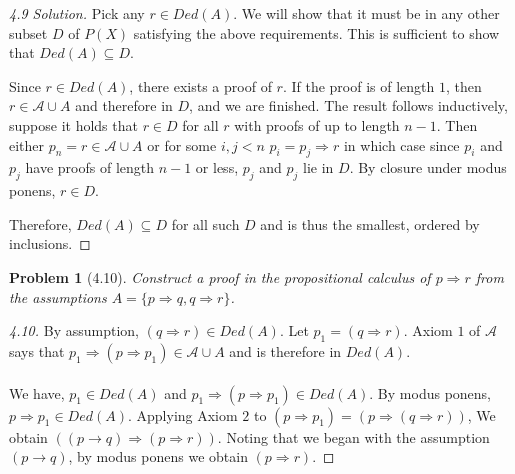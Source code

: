 \documentclass{article}
\theoremstyle{problemstyle}
\newtheorem{problem}{Problem}
\begin{document}
\begin{proof}[4.9 Solution]
Pick any $r \in Ded(A)$. We will show that it must be in any other subset $D$ of $P(X)$ satisfying the above requirements. This is sufficient to show that $Ded(A) \subseteq D$. 

Since $r \in Ded(A)$, there exists a proof of $r$. If the proof is of length $1$, then $r \in \mathscr{A} \cup A$ and therefore in $D$, and we are finished. The result follows inductively, suppose it holds that $r \in D$ for all $r$ with proofs of up to length $n-1$. Then either $p_n = r \in \mathscr{A} \cup A$ or for some $i,j<n$ $p_i = p_j \Rightarrow r$ in which case since $p_i$ and $p_j$ have proofs of length $n-1$ or less, $p_j$ and $p_j$ lie in $D$.  By closure under modus ponens, $r \in D$. 

Therefore, $Ded(A) \subseteq D$ for all such $D$ and is thus the smallest, ordered by inclusions. 
\end{proof}

\begin{problem}[4.10] 
Construct a proof in the propositional calculus of $p \Rightarrow r$ from the assumptions $A = \{p\Rightarrow q, q\Rightarrow r\}$. 
\end{problem}
\begin{proof}[4.10] 
By assumption, $(q \Rightarrow r) \in Ded(A)$. Let $p_1 = (q \Rightarrow r)$. Axiom $1$ of $\mathscr{A}$ says that $p_1 \Rightarrow (p \Rightarrow p_1) \in \mathscr{A} \cup A$ and is therefore in $Ded(A)$.\\\\We have, $p_1 \in Ded(A)$ and $p_1 \Rightarrow (p \Rightarrow p_1) \in Ded(A)$. By modus ponens, $p \Rightarrow p_1 \in Ded(A)$. Applying Axiom $2$ to $(p \Rightarrow p_1) = (p \Rightarrow (q \Rightarrow r))$, We obtain $((p \rightarrow q) \Rightarrow (p \Rightarrow r))$. Noting that we began with the assumption $(p \rightarrow q)$, by modus ponens we obtain $(p \Rightarrow r)$.
\end{proof}
\end{document}
